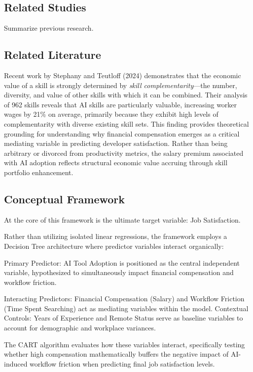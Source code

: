 \documentclass[
]{article}
\begin{document}
\subsection{Related Studies}\label{related-studies}

Summarize previous research.

\subsection{Related Literature}\label{related-literature}

Recent work by Stephany and Teutloff (2024) demonstrates that the
economic value of a skill is strongly determined by \emph{skill
complementarity}---the number, diversity, and value of other skills with
which it can be combined. Their analysis of 962 skills reveals that AI
skills are particularly valuable, increasing worker wages by 21\% on
average, primarily because they exhibit high levels of complementarity
with diverse existing skill sets. This finding provides theoretical
grounding for understanding why financial compensation emerges as a
critical mediating variable in predicting developer satisfaction. Rather
than being arbitrary or divorced from productivity metrics, the salary
premium associated with AI adoption reflects structural economic value
accruing through skill portfolio enhancement.

\subsection{Conceptual Framework}\label{conceptual-framework}

At the core of this framework is the ultimate target variable: Job
Satisfaction.

Rather than utilizing isolated linear regressions, the framework employs
a Decision Tree architecture where predictor variables interact
organically:

Primary Predictor: AI Tool Adoption is positioned as the central
independent variable, hypothesized to simultaneously impact financial
compensation and workflow friction.

Interacting Predictors: Financial Compensation (Salary) and Workflow
Friction (Time Spent Searching) act as mediating variables within the
model. Contextual Controls: Years of Experience and Remote Status serve
as baseline variables to account for demographic and workplace
variances.

The CART algorithm evaluates how these variables interact, specifically
testing whether high compensation mathematically buffers the negative
impact of AI-induced workflow friction when predicting final job
satisfaction levels.
\end{document}

